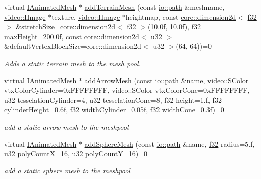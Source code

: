 \begin{DoxyCompactItemize}
virtual \hyperlink{classirr_1_1scene_1_1IAnimatedMesh}{I\+Animated\+Mesh} $\ast$ \hyperlink{classirr_1_1scene_1_1ISceneManager_ac56c56d5ec02bfe7cfb35db7afc19b50}{add\+Terrain\+Mesh} (const \hyperlink{namespaceirr_1_1io_a6468281622ce3a1c46b72e19f32dded5}{io\+::path} \&meshname, \hyperlink{classirr_1_1video_1_1IImage}{video\+::\+I\+Image} $\ast$texture, \hyperlink{classirr_1_1video_1_1IImage}{video\+::\+I\+Image} $\ast$heightmap, const \hyperlink{classirr_1_1core_1_1dimension2d}{core\+::dimension2d}$<$ \hyperlink{namespaceirr_a0277be98d67dc26ff93b1a6a1d086b07}{f32} $>$ \&stretch\+Size=\hyperlink{classirr_1_1core_1_1dimension2d}{core\+::dimension2d}$<$ \hyperlink{namespaceirr_a0277be98d67dc26ff93b1a6a1d086b07}{f32} $>$(10.\+0f, 10.\+0f), f32 max\+Height=200.\+0f, const core\+::dimension2d$<$ u32 $>$ \&default\+Vertex\+Block\+Size=core\+::dimension2d$<$ u32 $>$(64, 64))=0
\begin{DoxyCompactList}\small\item\em Adds a static terrain mesh to the mesh pool. \end{DoxyCompactList}\item 
virtual \hyperlink{classirr_1_1scene_1_1IAnimatedMesh}{I\+Animated\+Mesh} $\ast$ \hyperlink{classirr_1_1scene_1_1ISceneManager_ac1bca43a6301e6c9daf09806ea46309a}{add\+Arrow\+Mesh} (const \hyperlink{namespaceirr_1_1io_a6468281622ce3a1c46b72e19f32dded5}{io\+::path} \&name, \hyperlink{classirr_1_1video_1_1SColor}{video\+::\+S\+Color} vtx\+Color\+Cylinder=0x\+F\+F\+F\+F\+F\+F\+F\+F, video\+::\+S\+Color vtx\+Color\+Cone=0x\+F\+F\+F\+F\+F\+F\+F\+F, u32 tesselation\+Cylinder=4, u32 tesselation\+Cone=8, f32 height=1.\+f, f32 cylinder\+Height=0.\+6f, f32 width\+Cylinder=0.\+05f, f32 width\+Cone=0.\+3f)=0
\begin{DoxyCompactList}\small\item\em add a static arrow mesh to the meshpool \end{DoxyCompactList}\item 
virtual \hyperlink{classirr_1_1scene_1_1IAnimatedMesh}{I\+Animated\+Mesh} $\ast$ \hyperlink{classirr_1_1scene_1_1ISceneManager_a9e9e8524055ca841c0bb16316f4b8212}{add\+Sphere\+Mesh} (const \hyperlink{namespaceirr_1_1io_a6468281622ce3a1c46b72e19f32dded5}{io\+::path} \&name, \hyperlink{namespaceirr_a0277be98d67dc26ff93b1a6a1d086b07}{f32} radius=5.f, \hyperlink{namespaceirr_a0416a53257075833e7002efd0a18e804}{u32} poly\+CountX=16, \hyperlink{namespaceirr_a0416a53257075833e7002efd0a18e804}{u32} poly\+CountY=16)=0
\begin{DoxyCompactList}\small\item\em add a static sphere mesh to the meshpool \end{DoxyCompactList}\item 

\end{DoxyCompactItemize}
